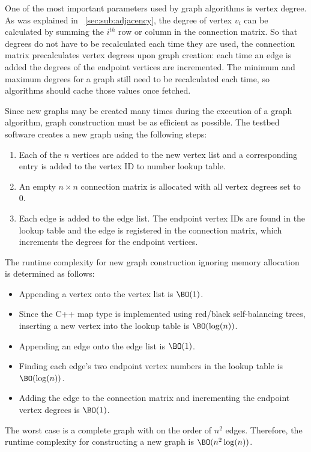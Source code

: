 One of the most important parameters used by graph algorithms is vertex degree.  As was explained in
\sectionname~\ref{sec:sub:adjacency}, the degree of vertex \(v_i\) can be calculated by summing the \(i^{th}\) row
or column in the connection matrix.  So that degrees do not have to be recalculated each time they are used, the
connection matrix precalculates vertex degrees upon graph creation: each time an edge is added the degrees of the
endpoint vertices are incremented.  The minimum and maximum degrees for a graph still need to be recalculated each
time, so algorithms should cache those values once fetched.

Since new graphs may be created many times during the execution of a graph algorithm, graph construction must be
as efficient as possible.  The testbed software creates a new graph using the following steps:
\begin{enumerate}
\item Each of the \(n\) vertices are added to the new vertex list and a corresponding entry is added to the vertex
  ID to number lookup table.
\item An empty \(n\times n\) connection matrix is allocated with all vertex degrees set to \(0\).
\item Each edge is added to the edge list.  The endpoint vertex IDs are found in the lookup table and the edge is
  registered in the connection matrix, which increments the degrees for the endpoint vertices.
\end{enumerate}

The runtime complexity for new graph construction ignoring memory allocation is determined as follows:
\begin{itemize}
\item Appending a vertex onto the vertex list is \(\BO(1)\).
\item Since the C++ map type is implemented using red/black self-balancing trees, inserting a new vertex into the
  lookup table is \(\BO(\log(n))\).
\item Appending an edge onto the edge list is \(\BO(1)\).
\item Finding each edge's two endpoint vertex numbers in the lookup table is \(\BO(\log(n))\).
\item Adding the edge to the connection matrix and incrementing the endpoint vertex degrees is \(\BO(1)\).
\end{itemize}

The worst case is a complete graph with on the order of \(n^2\) edges.  Therefore, the runtime complexity for
constructing a new graph is \(\BO(n^2\log(n))\).

